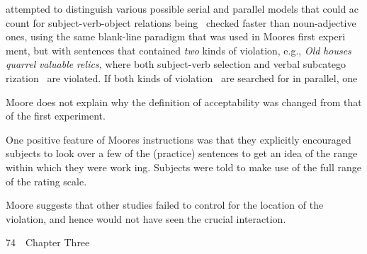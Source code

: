 \begin{styleStandard}
attempted to distinguish various possible serial and parallel models that could ac\- count for subject-verb-object relations being \ checked faster than noun-adjective ones, using the same blank-line paradigm that was used in Moore{\textquotesingle}s first experi\- ment, but with sentences that contained \textit{two}\textit{ }kinds of violation, e.g., \textit{Old}\textit{ }\textit{houses}\textit{ }\textit{quarrel}\textit{ }\textit{valuable}\textit{ }\textit{relics,}\textit{ }where both subject-verb selection and verbal subcatego\- rization \ are violated. If both kinds of violation \ are searched for in parallel, one
\end{styleStandard}


\begin{listWWNumlvleveli}
\item 
\setcounter{listWWNumlvlevelii}{1}
\begin{listWWNumlvlevelii}
\item 
\setcounter{listWWNumlvleveliii}{0}
\begin{listWWNumlvleveliii}
\item 
\begin{styleStandard}
Moore does not explain why the definition of acceptability was changed from that of the first experiment.
\end{styleStandard}


\item 
\begin{styleStandard}
One positive feature of Moore{\textquotesingle}s instructions was that they explicitly encouraged subjects to look over a few of the (practice) sentences to get an idea of the range within which they were work\- ing. Subjects were told to make use of the full range of the rating scale.
\end{styleStandard}


\item 
\begin{styleStandard}
Moore suggests that other studies failed to control for the location of the violation, and hence would not have seen the crucial interaction.
\end{styleStandard}


\end{listWWNumlvleveliii}
\end{listWWNumlvlevelii}
\end{listWWNumlvleveli}
\clearpage\setcounter{page}{1}\begin{styleStandard}
74\ \ Chapter Three
\end{styleStandard}


